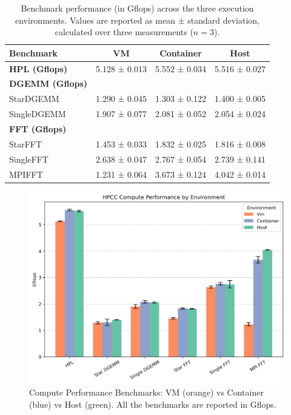 \begin{table}[htbp]
\centering

\renewcommand{\arraystretch}{1.2}
\begin{tabular}{lccc}
\toprule
\textbf{Benchmark} & \textbf{VM} & \textbf{Container} & \textbf{Host} \\
\midrule
\textbf{HPL (Gflops)} & 5.128 ± 0.013 & 5.552 ± 0.034 & 5.516 ± 0.027 \\
\midrule
\textbf{DGEMM (Gflops)} & & & \\
StarDGEMM     & 1.290 ± 0.045 & 1.303 ± 0.122 & 1.400 ± 0.005 \\
SingleDGEMM   & 1.907 ± 0.077 & 2.081 ± 0.052 & 2.054 ± 0.024 \\
\midrule
\textbf{FFT (Gflops)} & & & \\
StarFFT      & 1.453 ± 0.033 & 1.832 ± 0.025 & 1.816 ± 0.008 \\
SingleFFT    & 2.638 ± 0.047 & 2.767 ± 0.054 & 2.739 ± 0.141 \\
MPIFFT       & 1.231 ± 0.064 & 3.673 ± 0.124 & 4.042 ± 0.014 \\
\bottomrule
\end{tabular}
\caption{Benchmark performance (in Gflops) across the three execution environments. Values are reported as mean ± standard deviation, calculated over three measurements ($n = 3$).}
\label{tab:benchmark_performance}
\end{table}

\begin{figure}[htbp]
    \centering
    \includegraphics[width=0.8\linewidth]{assets/hpcc_compute_performance.png}
    \caption{Compute Performance Benchmarks: VM (orange) vs Container (blue) vs Host (green). All the benchmarks are reported in Gflops.}
    \label{fig:hpcc_compute_performance}
\end{figure}

